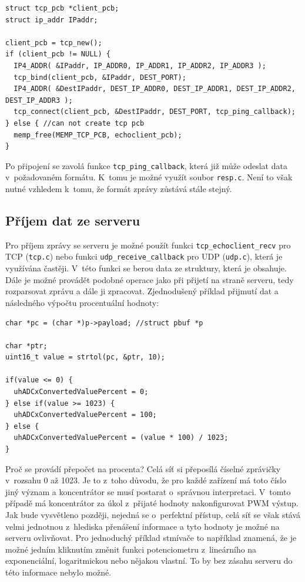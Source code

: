 \begin{verbatim}
struct tcp_pcb *client_pcb;
struct ip_addr IPaddr;

client_pcb = tcp_new();
if (client_pcb != NULL) {
  IP4_ADDR( &IPaddr, IP_ADDR0, IP_ADDR1, IP_ADDR2, IP_ADDR3 );
  tcp_bind(client_pcb, &IPaddr, DEST_PORT);
  IP4_ADDR( &DestIPaddr, DEST_IP_ADDR0, DEST_IP_ADDR1, DEST_IP_ADDR2, DEST_IP_ADDR3 );
  tcp_connect(client_pcb, &DestIPaddr, DEST_PORT, tcp_ping_callback);
} else { //can not create tcp pcb
  memp_free(MEMP_TCP_PCB, echoclient_pcb);
}
\end{verbatim}

Po připojení se zavolá funkce \texttt{tcp\_ping\_callback}, která již může odeslat data v~požadovaném formátu. K~tomu je možné využít soubor \texttt{resp.c}. Není to však nutné vzhledem k~tomu, že formát zprávy zůstává stále stejný.

\subsection{Příjem dat ze serveru}
Pro příjem zprávy se serveru je možné použít funkci \texttt{tcp\_echoclient\_recv} pro TCP (\texttt{tcp.c}) nebo funkci \texttt{udp\_receive\_callback} pro UDP (\texttt{udp.c}), která je využívána častěji. V~této funkci se berou data ze struktury, která je obsahuje. Dále je možné provádět podobné operace jako při přijetí na straně serveru, tedy rozparsovat zprávu a dále ji zpracovat. Zjednodušený příklad přijmutí dat a následného výpočtu procentuální hodnoty:

\begin{verbatim}
char *pc = (char *)p->payload; //struct pbuf *p

char *ptr;
uint16_t value = strtol(pc, &ptr, 10);
	
if(value <= 0) {
  uhADCxConvertedValuePercent = 0;
} else if(value >= 1023) {
  uhADCxConvertedValuePercent = 100;
} else {
  uhADCxConvertedValuePercent = (value * 100) / 1023;
}
\end{verbatim}

Proč se provádí přepočet na procenta? Celá síť si přeposílá číselné zprá\-vič\-ky v~rozsahu 0 až 1023. Je to z~toho důvodu, že pro každé zařízení má toto číslo jiný význam a koncentrátor se musí postarat o~správnou interpretaci. V~tomto případě má koncentrátor za úkol z~přijaté hodnoty nakonfigurovat PWM výstup. Jak bude vysvětleno později, nejedná se o~perfektní přístup, celá síť se však stává velmi jednotnou z~hlediska přenášení informace a tyto hodnoty je možné na serveru ovlivňovat. Pro jednoduchý příklad stmívače to například znamená, že je možné jedním kliknutím změnit funkci potenciometru z~lineárního na exponenciální, logaritmickou nebo nějakou vlastní. To by bez zásahu serveru do této informace nebylo možné.

